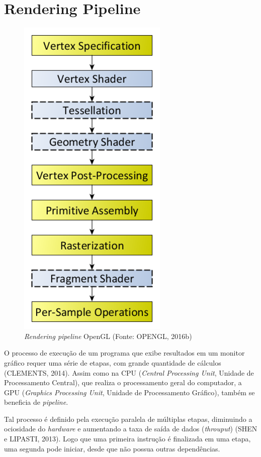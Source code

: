 \chapter{Rendering Pipeline}
\begin{figure}[H]
	\centering
	\includegraphics[scale=0.4]{imagens/openglPipeline.png}
	\caption{\small \textit{Rendering pipeline} OpenGL (Fonte: OPENGL, 2016b)}
	\label{fig:glpipeline}
\end{figure}

O processo de execução de um programa que exibe resultados em um monitor gráfico requer uma série de etapas, com grande quantidade de cálculos (CLEMENTS, 2014). Assim como na CPU (\textit{Central Processing Unit}, Unidade de Processamento Central), que realiza o processamento geral do computador, a GPU (\textit{Graphics Processing Unit}, Unidade de Processamento Gráfico), também se beneficia de \textit{pipeline}.

Tal processo é definido pela execução paralela de múltiplas etapas, diminuindo a ociosidade do \textit{hardware} e aumentando a taxa de saída de dados (\textit{throuput}) (SHEN e LIPASTI, 2013). Logo que uma primeira instrução é finalizada em uma etapa, uma segunda pode iniciar, desde que não possua outras dependências.

